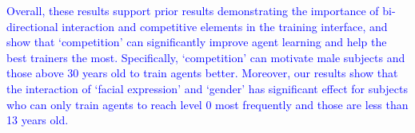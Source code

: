 

\textcolor{blue}{Overall, these results support prior results \cite{li2014learning} demonstrating the importance of bi-directional interaction and competitive elements in the training interface, and show that `competition' can significantly improve agent learning and help the best trainers the most. Specifically, `competition' can motivate male subjects and those above 30 years old to train agents better. Moreover, our results show that the interaction of `facial expression' and `gender' has significant effect for subjects who can only train agents to reach level 0 most frequently and those are less than 13 years old. %
}

